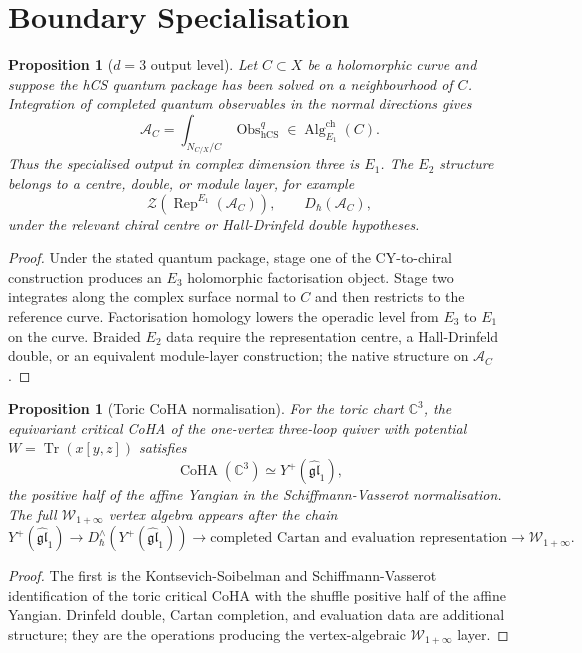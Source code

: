 \documentclass[11pt]{article}
\newtheorem{proposition}[theorem]{Proposition}
\theoremstyle{definition}
\theoremstyle{remark}
\providecommand{\C}{\mathbb{C}}
\providecommand{\fgl}{\mathfrak{gl}}
\providecommand{\Tr}{\operatorname{Tr}}
\providecommand{\Rep}{\operatorname{Rep}}
\providecommand{\CoHA}{\operatorname{CoHA}}
\providecommand{\Obs}{\operatorname{Obs}}
\providecommand{\hCS}{\operatorname{hCS}}
\providecommand{\cZ}{\mathcal{Z}}
\providecommand{\Yp}{Y^{+}}
\providecommand{\Winf}{\mathcal{W}_{1+\infty}}
\providecommand{\Eone}{E_1}
\providecommand{\Etwo}{E_2}
\providecommand{\Ethree}{E_3}
\begin{document}
\section{Boundary Specialisation}
\label{sec:boundary-specialisation}

\begin{proposition}[$d=3$ output level]
\label{prop:d3-output-level}
Let $C\subset X$ be a holomorphic curve and suppose the hCS quantum
package has been solved on a neighbourhood of $C$.  Integration of
completed quantum observables in the normal directions gives
\[
  \mathcal A_C
  =
  \int_{N_{C/X}/C}\Obs^q_{\hCS}
  \in
  \operatorname{Alg}^{\mathrm{ch}}_{\Eone}(C).
\]
Thus the specialised output in complex dimension three is $\Eone$.
The $\Etwo$ structure belongs to a centre, double, or module layer, for
example
\[
  \cZ\!\left(\Rep^{\Eone}(\mathcal A_C)\right),
  \qquad
  D_\hbar(\mathcal A_C),
\]
under the relevant chiral centre or Hall-Drinfeld double hypotheses.
\end{proposition}

\begin{proof}
Under the stated quantum package, stage one of the CY-to-chiral
construction produces an $\Ethree$ holomorphic factorisation object.
Stage two integrates along the complex surface normal to $C$ and then
restricts to the reference curve.  Factorisation homology lowers the
operadic level from $\Ethree$ to $\Eone$ on the curve.  Braided $\Etwo$
data require the representation centre, a Hall-Drinfeld double, or an
equivalent module-layer construction; the native structure on
$\mathcal A_C$.
\end{proof}

\begin{proposition}[Toric CoHA normalisation]
\label{prop:c3-coha-normalisation}
For the toric chart $\C^3$, the equivariant critical CoHA of the
one-vertex three-loop quiver with potential
$W=\Tr(x[y,z])$ satisfies
\[
  \CoHA(\C^3)\simeq \Yp(\widehat{\fgl}_1),
\]
the positive half of the affine Yangian in the Schiffmann-Vasserot
normalisation.  The full $\Winf$ vertex algebra appears after the chain
\[
  \Yp(\widehat{\fgl}_1)
  \longrightarrow
  D^\wedge_\hbar\!\left(\Yp(\widehat{\fgl}_1)\right)
  \longrightarrow
  \text{completed Cartan and evaluation representation}
  \longrightarrow
  \Winf .
\]
\end{proposition}

\begin{proof}
The first is the Kontsevich-Soibelman and Schiffmann-Vasserot
identification of the toric critical CoHA with the shuffle positive
half of the affine Yangian.  Drinfeld double, Cartan completion, and
evaluation data are additional structure; they are the operations
producing the vertex-algebraic $\Winf$ layer.
\end{proof}
\end{document}
